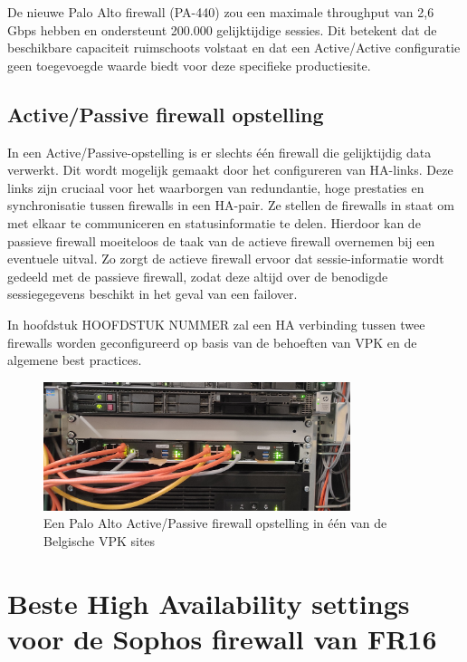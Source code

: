 De nieuwe Palo Alto firewall (PA-440) zou een maximale throughput van 2,6 Gbps hebben en ondersteunt 200.000 gelijktijdige sessies. \autocite{PaloAltoDS2025} Dit betekent dat de beschikbare capaciteit ruimschoots volstaat en dat een Active/Active configuratie geen toegevoegde waarde biedt voor deze specifieke productiesite.



\subsection{Active/Passive firewall opstelling}

In een Active/Passive-opstelling is er slechts één firewall die gelijktijdig data verwerkt. Dit wordt mogelijk gemaakt door het configureren van HA-links. Deze links zijn cruciaal voor het waarborgen van redundantie, hoge prestaties en synchronisatie tussen firewalls in een HA-pair. Ze stellen de firewalls in staat om met elkaar te communiceren en statusinformatie te delen. Hierdoor kan de passieve firewall moeiteloos de taak van de actieve firewall overnemen bij een eventuele uitval. Zo zorgt de actieve firewall ervoor dat sessie-informatie wordt gedeeld met de passieve firewall, zodat deze altijd over de benodigde sessiegegevens beschikt in het geval van een failover. \autocite{PaloAltoHA2025} \autocite{PaloAltoHAb2025}

In hoofdstuk HOOFDSTUK NUMMER zal een HA verbinding tussen twee firewalls worden geconfigureerd op basis van de behoeften van VPK en de algemene best practices.

\begin{figure}[H]
    \centering
    \includegraphics[width=0.8\textwidth]{fotos/PA_FirewallPairBE02.jpg}
    \caption[Palo Alto ACtive/Passive pair]{\label{fig:grail}Een Palo Alto Active/Passive firewall opstelling in één van de Belgische VPK sites}
\end{figure} 



\section{Beste High Availability settings voor de Sophos firewall van FR16}

